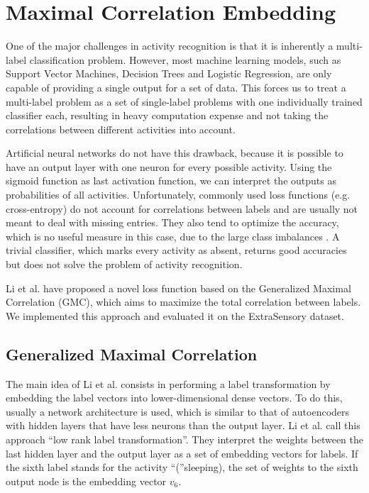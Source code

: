 \section{Maximal Correlation Embedding}

One of the major challenges in activity recognition is that it is inherently a multi-label classification problem. However, most machine learning models, such as Support Vector Machines, Decision Trees and Logistic Regression, are only capable of providing a single output for a set of data. This forces us to treat a multi-label problem as a set of single-label problems with one individually trained classifier each, resulting in heavy computation expense and not taking the correlations between different activities into account.

Artificial neural networks do not have this drawback, because it is possible to have an output layer with one neuron for every possible activity. Using the sigmoid function as last activation function, we can interpret the outputs as probabilities of all activities. Unfortunately, commonly used loss functions (e.g. cross-entropy) do not account for correlations between labels and are usually not meant to deal with missing entries. They also tend to optimize the accuracy, which is no useful measure in this case, due to the large class imbalances \cite{Vaizman17}. A trivial classifier, which marks every activity as absent, returns good accuracies but does not solve the problem of activity recognition.

Li et al. \cite{Li19} have proposed a novel loss function based on the Generalized Maximal Correlation (GMC), which aims to maximize the total correlation between labels. We implemented this approach and evaluated it on the ExtraSensory dataset.

\subsection{Generalized Maximal Correlation}

The main idea of Li et al. \cite{li2019} consists in performing a label transformation by embedding the label vectors into lower-dimensional dense vectors. To do this, usually a network architecture is used, which is similar to that of autoencoders with hidden layers that have less neurons than the output layer. Li et al. call this approach \enquote{low rank label transformation}. They interpret the weights between the last hidden layer and the output layer as a set of embedding vectors for labels. If the sixth label stands for the activity \enquote(sleeping), the set of weights to the sixth output node is the embedding vector $v_6$.

